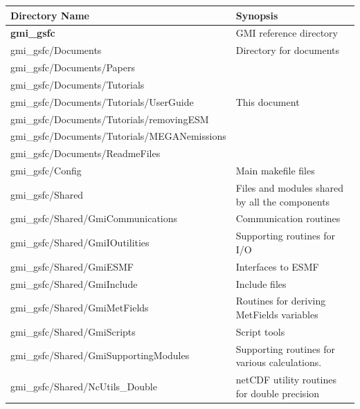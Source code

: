 {\small

\begin{landscape}

\begin{center}
\begin{longtable}{|l|l|} \hline \hline
{\bf Directory Name}                & {\bf Synopsis} \\ \hline\hline
{\bf gmi\_gsfc }                          & GMI reference directory \\ \hline
gmi\_gsfc/Documents                       & Directory for documents                 \\ \hline
gmi\_gsfc/Documents/Papers                &                                       \\ \hline
gmi\_gsfc/Documents/Tutorials             &                         \\ \hline
gmi\_gsfc/Documents/Tutorials/UserGuide   & This document           \\ \hline
gmi\_gsfc/Documents/Tutorials/removingESM   &                         \\ \hline
gmi\_gsfc/Documents/Tutorials/MEGANemissions &                         \\ \hline
gmi\_gsfc/Documents/ReadmeFiles           &                                       \\ \hline
gmi\_gsfc/Config                          &  Main makefile files \\  \hline
gmi\_gsfc/Shared               & Files and modules shared by all the components \\ \hline
gmi\_gsfc/Shared/GmiCommunications        &  Communication routines             \\ \hline
gmi\_gsfc/Shared/GmiIOutilities         &   Supporting routines for I/O          \\ \hline
gmi\_gsfc/Shared/GmiESMF                &  Interfaces to ESMF                      \\ \hline
gmi\_gsfc/Shared/GmiInclude         &   Include files                              \\ \hline
gmi\_gsfc/Shared/GmiMetFields         &  Routines for deriving MetFields variables   \\ \hline
gmi\_gsfc/Shared/GmiScripts         &   Script tools                                   \\ \hline
gmi\_gsfc/Shared/GmiSupportingModules & Supporting routines for various calculations.  \\ \hline
gmi\_gsfc/Shared/NcUtils\_Double         & netCDF utility routines for double precision \\ \hline

\end{longtable}
\end{center}
\end{landscape}}
